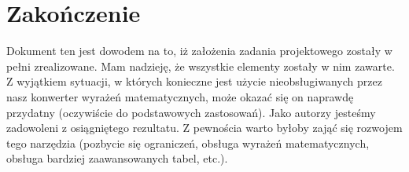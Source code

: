 \documentclass[10pt,a4paper]{article}
\begin{document}
\section{Zakończenie}
Dokument ten jest dowodem na to, iż założenia zadania projektowego zostały w pełni zrealizowane. Mam nadzieję, że wszystkie elementy zostały w nim zawarte. Z wyjątkiem sytuacji, w których konieczne jest użycie nieobsługiwanych przez nasz konwerter wyrażeń matematycznych, może okazać się on naprawdę przydatny (oczywiście do podstawowych zastosowań). Jako autorzy jesteśmy zadowoleni z osiągniętego rezultatu. Z pewnościa warto byłoby zająć się rozwojem tego narzędzia (pozbycie się ograniczeń, obsługa wyrażeń matematycznych, obsługa bardziej zaawansowanych tabel, etc.).
\end{document}
